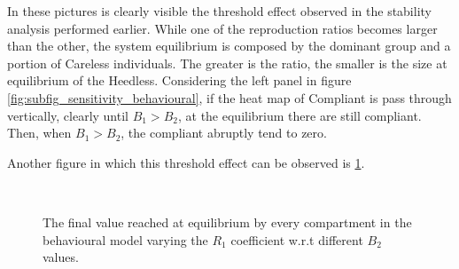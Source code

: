 In these pictures is clearly visible the threshold effect observed in the stability analysis performed earlier. While one of the reproduction ratios becomes larger than the other, the system equilibrium is composed by the dominant group and a portion of Careless individuals. The greater is the ratio, the  smaller is the size at equilibrium of the Heedless. Considering the left panel in figure \ref{fig:subfig_sensitivity_behavioural}, if the heat map of Compliant is pass through vertically, clearly until $B_1 > B_2$, at the equilibrium there are still compliant. Then, when $B_1 > B_2$, the compliant abruptly tend to zero. 

Another figure in which this threshold effect can be observed is \ref{fig:subfig_sensitivity_behavioural_r1}.

\begin{figure}[h]
	\centering
	 \quad
	 \\
	\caption[Final Behavioural compartments varying $B_1$]{The final value reached at equilibrium by every compartment in the behavioural model varying the $R_1$ coefficient w.r.t different $B_2$ values.}
	\label{fig:subfig_sensitivity_behavioural_r1}
\end{figure}
